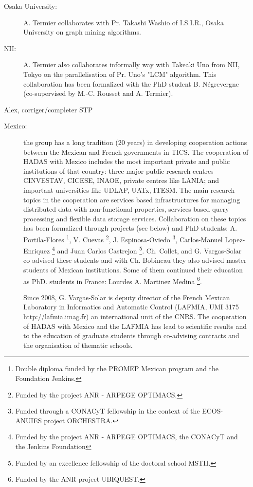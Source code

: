 \begin{description}

\item[Osaka University:] 
A. Termier collaborates with Pr. Takashi Washio of I.S.I.R., Osaka University on graph mining algorithms. 
\item[NII:] 
A. Termier also collaborates informally way with Takeaki Uno from NII, Tokyo on the parallelisation of Pr. Uno's "LCM" algorithm.
This collaboration has been formalized with the PhD student B.  N{\'e}grevergne (co-supervised by M.-C. Rousset and A. Termier). 

\end{description}

Alex, corriger/completer STP


\begin{description}
\item[Mexico:] the group has a long tradition (20 years) in developing cooperation actions between the Mexican and French governments in TICS. 
The cooperation of HADAS with Mexico includes the most important private and public institutions of that country: three major public research centres CINVESTAV, CICESE, INAOE, private centres like LANIA; and important universities like UDLAP, UATx, ITESM. 
The main research topics in the cooperation are services based infrastructures for managing distributed data with non-functional properties, services based query processing and flexible data storage services.  Collaboration on these topics has been formalized through projects (see below) and PhD students: A. Portila-Flores \footnote{Double diploma funded by the PROMEP Mexican program and the Foundation Jenkins.}, V. Cuevas \footnote{Funded by the project ANR - ARPEGE OPTIMACS.}, J. Espinosa-Oviedo \footnote{Funded through a CONACyT fellowship in the context of the ECOS-ANUIES project ORCHESTRA.}, Carlos-Manuel Lopez-Enriquez \footnote{Funded by the project ANR - ARPEGE OPTIMACS, the CONACyT and the Jenkins Foundation} and Juan Carlos Castrejon \footnote{Funded by an excellence fellowship of the doctoral school MSTII.}.  Ch. Collet, and G. Vargas-Solar co-advised these students and with Ch. Bobineau they also advised master students of Mexican institutions. Some of them continued their education as PhD. students in France: Lourdes A. Martinez Medina \footnote{Funded by the ANR project UBIQUEST.}. 


Since 2008, G. Vargas-Solar is deputy director of the French Mexican Laboratory in Informatics and Automatic Control (LAFMIA, UMI 3175 http://lafmia.imag.fr) an international unit of the CNRS. 
The cooperation of HADAS with Mexico and the LAFMIA has lead to scientific results and to the education of graduate students through co-advising contracts and the organisation of thematic schools. 




\end{description}
